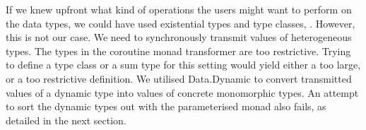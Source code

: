 
If we knew upfront what kind of operations the users might want to perform on the data types, we could have used existential types and type classes, \viz \cite{Laufer:1994:PTI:186025.186031,Kiselyov:2004:STH:1017472.1017488}.
However, this is not our case.
We need to synchronously transmit values of heterogeneous types.
The types in the coroutine monad transformer are too restrictive.
Trying to define a type class or a sum type for this setting would yield either a too large, or a too restrictive definition.
%
We utilised \textsf{Data.Dynamic} to convert transmitted values of a dynamic type into values of concrete monomorphic types.
An attempt to sort the dynamic types out with the parameterised monad also fails, as detailed in the next section.

